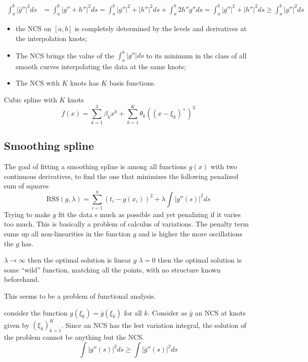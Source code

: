 \documentclass[a4paper]{article}
\newcommand{\clo}[1]{{\left [ #1 \right ]}}
\newcommand{\brac}[1]{{\left ( #1 \right )}}
\newcommand{\abs}[1]{{\left | #1 \right |}}
\newcommand{\RSS}{{\text{RSS}}}
\begin{document}
\begin{align*}
\int_a^b \abs{\bar{g}''}^2 ds &= 
\int_a^b \abs{g'' + h''}^2 ds = \int_a^b \abs{g''}^2 + \abs{h''}^2 ds + \int_a^b 2h''g'' ds= \int_a^b \abs{g''}^2 + \abs{h''}^2 ds \geq \int_a^b \abs{g''}^2 ds
\end{align*}

\begin{itemize}
	\item the NCS on $\clo{a,b}$ is completely determined by the levels and derivatives at the interpolation knots;
	\item The NCS brings the value of the $\int_a^b \abs{g''}ds$ to its minimum in the class of all smooth curves interpolating the data at the same knots;
	\item The NCS with $K$ knots has $K$ basis functions.
\end{itemize}


Cubic spline with $K$ knots
\[f(x) = \sum_{k=1}^3 \beta_k x^k + \sum_{k=1}^K \theta_k \brac{\brac{x-\xi_k}^+}^3\]



\subsection{Smoothing spline} %
\label{sub:smoothing_spline}

The goal of fitting a smoothing spline is among all functions $g(x)$ with two continuous derivatives, to find the one that minimizes the following penalized sum of squares
\[\RSS(g,\lambda) = \sum_{i=1}^n \brac{t_i - g(x_i)}^2 + \lambda \int \abs{g''(s)}^2 ds\]
Trying to make $g$ fit the data s much as possible and yet penalizing if it varies too much. This is basically a problem of calculus of variations. The penalty term sums up all non-linearities in the function $g$ and is higher the more oscillations the $g$ has.

$\lambda\to \infty$ then the optimal solution is linear $g$
$\lambda = 0$ then the optimal solution is some ``wild'' function, matching all the points, with no structure known beforehand.


This seems to be a problem of functional analysis.

consider the function $g(\xi_k) = \bar{g}(\xi_k)$ for all $k$.
Consider as $\bar{g}$ an NCS at knots given by $\brac{\xi_k}_{k=1}^K$.
Since an NCS has the lest variation integral, the solution of the problem cannot be anything but the NCS.
\[\int \abs{g''(s)}^2 ds\geq \int \abs{\bar{g}''(s)}^2 ds\]
\end{document}
